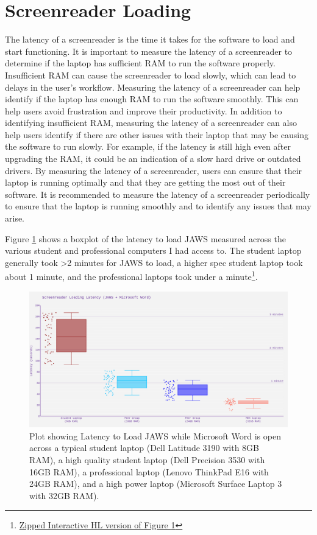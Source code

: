 \pagebreak \hypertarget{screenreader-loading}{}\section{Screenreader Loading}\label{screenreader-loading}
The latency of a screenreader is the time it takes for the software to load and start functioning. It is important to measure the latency of a screenreader to determine if the laptop has sufficient RAM to run the software properly. Insufficient RAM can cause the screenreader to load slowly, which can lead to delays in the user’s workflow. Measuring the latency of a screenreader can help identify if the laptop has enough RAM to run the software smoothly. This can help users avoid frustration and improve their productivity. In addition to identifying insufficient RAM, measuring the latency of a screenreader can also help users identify if there are other issues with their laptop that may be causing the software to run slowly. For example, if the latency is still high even after upgrading the RAM, it could be an indication of a slow hard drive or outdated drivers. By measuring the latency of a screenreader, users can ensure that their laptop is running optimally and that they are getting the most out of their software. It is recommended to measure the latency of a screenreader periodically to ensure that the laptop is running smoothly and to identify any issues that may arise.

Figure \ref{fig:figure 1} shows a boxplot of the latency to load JAWS measured across the various student and professional computers I had access to. The student laptop generally took \textgreater2 minutes for JAWS to load, a higher spec student laptop took about 1 minute, and the professional laptops took under a minute\footnote{\raggedright \href{http://github.com/mrhunsaker/MiscResources/raw/main/ComputerRBDisplaySpecsTVIFig1.zip}{Zipped Interactive HL version of Figure \ref{fig:figure 1}}}.

\begin{figure}[H]
	\centering
	\includegraphics[width=\textwidth]{images/ComputerRBDisplaySpecsTVIFig1.png}
	
	\caption[Latency to Load JAWS]{Plot showing Latency to Load JAWS while Microsoft Word is open across a typical student laptop (Dell Latitude 3190 with 8GB RAM), a high quality student laptop (Dell Precision 3530 with 16GB RAM), a professional laptop (Lenovo ThinkPad E16 with 24GB RAM), and a high power laptop (Microsoft Surface Laptop 3 with 32GB RAM).}\label{fig:figure 1}
\end{figure}

